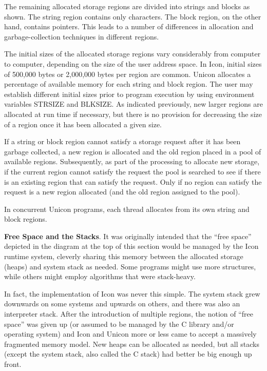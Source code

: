 The remaining allocated storage regions are divided into strings and blocks as
shown. The string region contains only characters. The block region,
on the other hand, contains pointers. This leads to a number of
differences in allocation and garbage-collection techniques in
different regions.

The initial sizes of the allocated storage regions vary considerably
from computer to computer, depending on the size of the user address
space. In Icon, initial sizes of 500,000 bytes or 2,000,000 bytes per
region are common. {\color{blue}Unicon allocates a percentage of
available memory for each string and block region.} The user may
establish different initial sizes prior to program execution by using
environment variables STRSIZE and BLKSIZE. As indicated previously,
new larger regions are allocated at run time if necessary, but there
is no provision for decreasing the size of a region once it has been
allocated a given size.

If a string or block region cannot satisfy a storage request after it
has been garbage collected, a new region is allocated and the old
region placed in a pool of available regions. Subsequently, as part of
the processing to allocate new storage, if the current region cannot
satisfy the request the pool is searched to see if there is an
existing region that can satisfy the request. Only if no region can
satisfy the request is a new region allocated (and the old region
assigned to the pool).

{\color{blue}
In concurrent Unicon programs, each thread allocates from its own string and block regions.
}

\textbf{Free Space and the Stacks}.  It was originally intended that
the ``free space'' depicted in the diagram at the top of this section
would be managed by the Icon runtime system, cleverly sharing this
memory between the allocated storage (heaps) and system stack as
needed. Some programs might use more structures, while others might
employ algorithms that were stack-heavy.

In fact, the implementation of Icon was never this simple. The system
stack grew downwards on some systems and upwards on others, and there
was also an interpreter stack. After the introduction of multiple
regions, the notion of ``free space'' was given up (or assumed to be
managed by the C library and/or operating system) and Icon and Unicon
more or less came to accept a massively fragmented memory model. New
heaps can be allocated as needed, but all stacks (except the system
stack, also called the C stack) had better be big enough up front.

